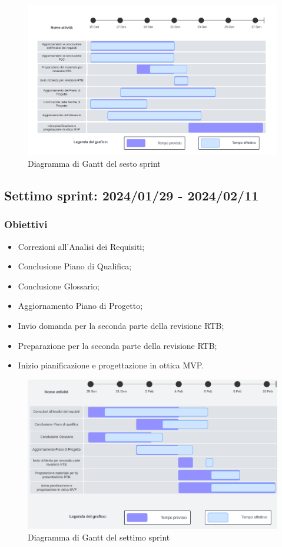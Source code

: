 \begin{figure}[h!]
    \centering  
    \includegraphics[width=\textwidth]{Roadmap6sprint.png}
    \caption{Diagramma di Gantt del sesto sprint}
    \label{fig:roadmap6s}
\end{figure}
\newpage

\subsection{Settimo sprint: 2024/01/29 - 2024/02/11}
\subsubsection{Obiettivi}
\begin{itemize}
    \item Correzioni all'Analisi dei Requisiti;
    \item Conclusione Piano di Qualifica;
    \item Conclusione Glossario;
    \item Aggiornamento Piano di Progetto;
    \item Invio domanda per la seconda parte della revisione RTB;
    \item Preparazione per la seconda parte della revisione RTB;
    \item Inizio pianificazione e progettazione in ottica MVP.
\end{itemize}

\begin{figure}[h!]
    \centering  
    \includegraphics[width=\textwidth]{Roadmap7sprint.png}
    \caption{Diagramma di Gantt del settimo sprint}
    \label{fig:roadmap7s}
\end{figure}
\newpage


